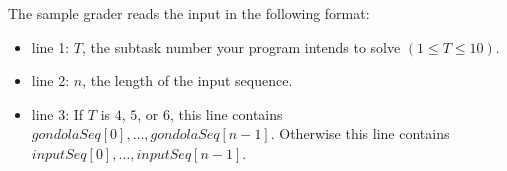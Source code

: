 The sample grader reads the input in the following format:
\begin{itemize}
\item line 1: $T$, the subtask number your program intends to solve $(1 \le T \le 10)$.
\item line 2: $n$, the length of the input sequence.
\item line 3: If $T$ is $4$, $5$, or $6$, this line contains $gondolaSeq[0], \ldots, gondolaSeq[n - 1]$. Otherwise this line contains $inputSeq[0], \ldots, inputSeq[n - 1]$.
\end{itemize}